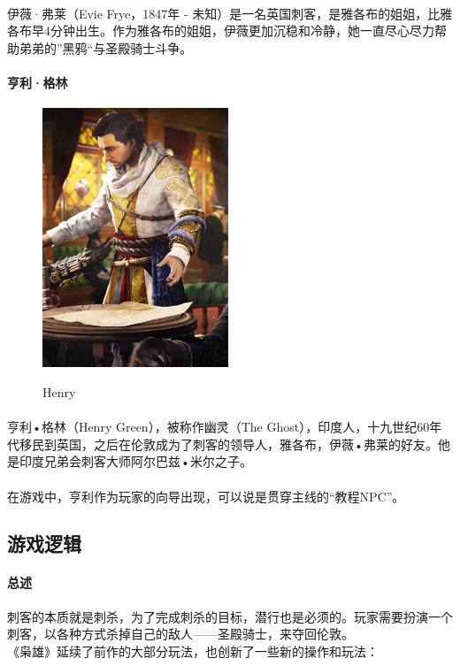 \documentclass{article} \usepackage{CJK}
\begin{document}
\paragraph{}
伊薇·弗莱（Evie Frye，1847年 - 未知）是一名英国刺客，是雅各布的姐姐，比雅各布早4分钟出生。作为雅各布的姐姐，伊薇更加沉稳和冷静，她一直尽心尽力帮助弟弟的”黑鸦“与圣殿骑士斗争。
\paragraph{亨利·格林}
\begin{figure}[!h]
  \centering
  \includegraphics[width=15em]{henry.jpg}\\
  \caption{Henry}\label{1-3}
\end{figure}
\paragraph{}
亨利•格林（Henry Green），被称作幽灵（The Ghost），印度人，十九世纪60年代移民到英国，之后在伦敦成为了刺客的领导人，雅各布，伊薇•弗莱的好友。他是印度兄弟会刺客大师阿尔巴兹•米尔之子。
\paragraph{}
在游戏中，亨利作为玩家的向导出现，可以说是贯穿主线的“教程NPC”。
\subsection{游戏逻辑}
\paragraph{总述}
刺客的本质就是刺杀，为了完成刺杀的目标，潜行也是必须的。玩家需要扮演一个刺客，以各种方式杀掉自己的敌人——圣殿骑士，来夺回伦敦。\\
《枭雄》延续了前作的大部分玩法，也创新了一些新的操作和玩法：
\end{document}
